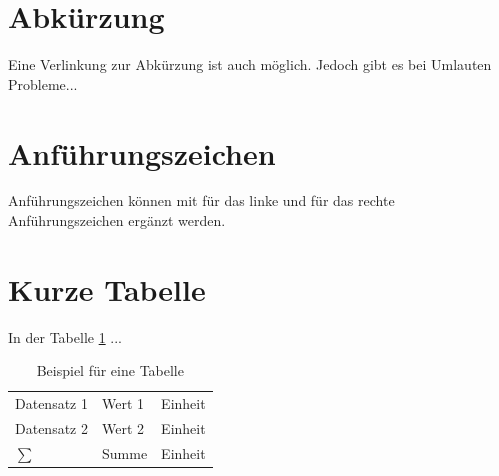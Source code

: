 \section{Abkürzung}
Eine Verlinkung zur \acs{Abkürzung} ist auch möglich. Jedoch gibt es bei Umlauten Probleme...

\section{Anführungszeichen}
\glqq Anführungszeichen\grqq{} können mit \texttt{\glqq} für das linke und \texttt{\grqq{}} für das rechte Anführungszeichen ergänzt werden.

\section{Kurze Tabelle}
In der Tabelle \ref{tbl_example_table} ...

\begin{table}[!h]
    \centering
    \begin{tabular}{l|ll}
        Datensatz 1     & Wert 1    & Einheit \\
        Datensatz 2     & Wert 2    & Einheit \\ \hline
        $\sum$          & Summe     & Einheit \\
    \end{tabular}
    \caption{Beispiel für eine Tabelle}
    \label{tbl_example_table}
\end{table}

